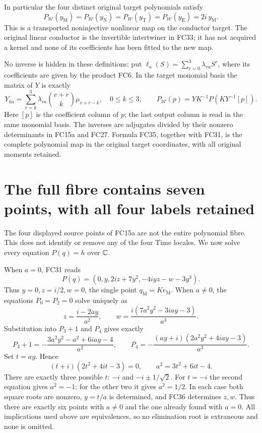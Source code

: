 In particular the four distinct original target polynomials satisfy
\[
 P_{\mathcal W}(y_{\mathrm M})=
 P_{\mathcal W}(y_{\mathrm N})=
 P_{\mathcal W}(y_{\mathrm T})=
 P_{\mathcal W}(y_{\mathrm E})=2i\,y_{\mathrm M}.
 \tag{FC34}
\]
This is a transported noninjective nonlinear map on the conductor
target. The original linear conductor is the invertible intertwiner
in FC33; it has not acquired a kernel and none of its coefficients
has been fitted to the new map.

No inverse is hidden in these definitions: put
$\ell_a(S)=\sum_{r=0}^3\lambda_{ra}S^r$, where its coefficients are
given by the product FC6. In the target monomial basis the matrix of
$Y$ is exactly
\[
 Y_{ka}=\sum_{r=k}^3\lambda_{ra}\binom{v+r}{k}\mu_{v+r-k},
 \quad 0\le k\le3,\qquad
 P_{\mathcal W}(p)=YK^{-1}P(KY^{-1}[p]).
 \tag{FC35}
\]
Here $[p]$ is the coefficient column of $p$; the last output column is
read in the same monomial basis. The inverses are adjugates divided
by their nonzero determinants in FC15a and FC27. Formula FC35,
together with FC31, is the complete polynomial map in the original
target coordinates, with all original moments retained.

\section{The full fibre contains seven points, with all four labels retained}
The four displayed source points of FC15a are not the entire polynomial
fibre. This does not identify or remove any of the four Time locales.
We now solve every equation $P(q)=h$ over $\mathbb C$.

When $a=0$, FC31 reads
\[
 P(q)=(0,y,2iz+7y^2,-4iyz-w-3y^3).
\]
Thus $y=0,z=i/2,w=0$, the single point $q_{\mathrm M}=Ke_{\mathrm M}$.
When $a\ne0$, the equations $P_0=P_2=0$ solve uniquely as
\[
 z=\frac{i-2ay}{a^2},\qquad
 w=\frac{i(7a^2y^2-3iay-3)}{a^3}.
 \tag{FC36}
\]
Substitution into $P_3+1$ and $P_4$ gives exactly
\[
 P_3+1=-\frac{3a^2y^2-a^2+6iay-4}{a^2},\qquad
 P_4=-\frac{(ay+i)(2a^2y^2+4iay-3)}{a^3}.
 \tag{FC37}
\]
Set $t=ay$. Hence
\[
 (t+i)(2t^2+4it-3)=0,\qquad a^2=3t^2+6it-4.
 \tag{FC38}
\]
There are exactly three possible $t$: $-i$ and $-i\pm1/\sqrt2$.
For $t=-i$ the second equation gives $a^2=-1$; for the other two it
gives $a^2=1/2$. In each case both square roots are nonzero, $y=t/a$
is determined, and FC36 determines $z,w$. Thus there are exactly six
points with $a\ne0$ and the one already found with $a=0$.
All implications used above are equivalences, so no elimination root
is extraneous and none is omitted.

